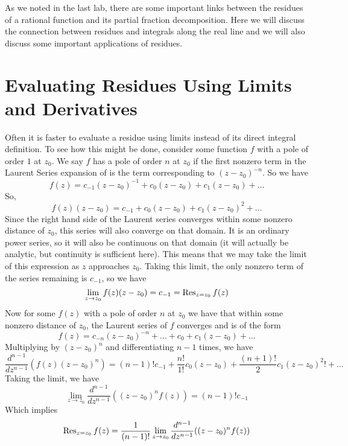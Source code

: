 

As we noted in the last lab, there are some important links between the residues of a rational function and its partial fraction decomposition. Here we will discuss the connection between residues and integrals along the real line and we will also discuss some important applications of residues.

\section*{Evaluating Residues Using Limits and Derivatives}
Often it is faster to evaluate a residue using limits instead of its direct integral definition. To see how this might be done, consider some function $f$ with a pole of order $1$ at $z_0$. We say $f$ has a pole of order $n$ at $z_0$ if the first nonzero term in the Laurent Series expansion of is the term corresponding to $(z-z_0)^{-n}$. So we have
$$f(z)=c_{-1}(z-z_0)^{-1}+c_0 (z-z_0) +c_1 (z-z_0) + \dots$$
So,
$$f(z)(z-z_0)=c_{-1}+c_0 (z-z_0) + c_1 (z-z_0)^2 + \dots$$
Since the right hand side of the Laurent series converges within some nonzero distance of $z_0$, this series will also converge on that domain. It is an ordinary power series, so it will also be continuous on that domain (it will actually be analytic, but continuity is sufficient here). This means that we may take the limit of this expression as $z$ approaches $z_0$. Taking this limit, the only nonzero term of the series remaining is $c_{-1}$, so we have
\begin{equation*}
\lim_{z\to z_0} f(z)(z-z_0) = c_{-1} = \operatorname{Res}_{z=z_0} f(z)
\end{equation*}
Now for some $f(z)$ with a pole of order $n$ at $z_0$ we have that within some nonzero distance of $z_0$, the Laurent series of $f$ converges and is of the form
$$f(z)=c_{-n}(z-z_0)^{-n}+\dots+c_0+c_1(z-z_0)+\dots$$
Multiplying by $(z-z_0)^{n}$ and differentiating $n-1$ times, we have
$$\frac{d^{n-1}}{dz^{n-1}}(f(z)(z-z_0)^{n})=(n-1)! c_{-1} + \frac{n!}{1!} c_0 (z-z_0) + \frac{(n+1)!}{2} c_1 (z-z_0)^2!+\dots$$
Taking the limit, we have
\begin{equation*}
\lim_{z\to z_0}\frac{d^{n-1}}{dz^{n-1}}((z-z_0)^n f(z)) = (n-1)! c_{-1}
\end{equation*}
Which implies
\begin{equation*}
\operatorname{Res}_{z=z_0}f(z)=\frac{1}{(n-1)!}\lim_{z\to z_0}\frac{d^{n-1}}{dz^{n-1}}((z-z_0)^n f(z))
\end{equation*}	
